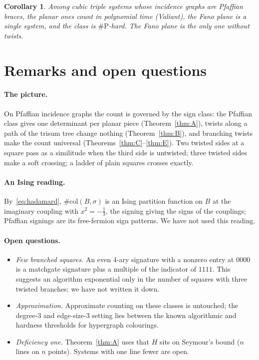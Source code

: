\documentclass[11pt]{article}
\newtheorem{corollary}[theorem]{Corollary}
\theoremstyle{definition}
\theoremstyle{remark}
\newcommand{\sharpP}{\#\mathrm{P}}
\newcommand{\col}{\#\mathrm{col}}
\begin{document}
\begin{corollary}\label{cor:picture}
Among cubic triple systems whose incidence graphs are Pfaffian braces, the
planar ones count in polynomial time (Valiant), the Fano plane is a single
system, and the class is $\sharpP$-hard. The Fano plane is the only one
without twists.
\end{corollary}

\section{Remarks and open questions}\label{sec:remarks}

\paragraph{The picture.} On Pfaffian incidence graphs the count is governed by
the sign class: the Pfaffian class gives one determinant per planar piece
(Theorem~\ref{thm:A}), twists along a path of the trisum tree change nothing
(Theorem~\ref{thm:B}), and branching twists make the count universal
(Theorems~\ref{thm:C}--\ref{thm:E}). Two twisted sides at a square pass as a
similitude when the third side is untwisted; three twisted sides make a soft
crossing; a ladder of plain squares crosses exactly.

\paragraph{An Ising reading.} By~\eqref{eq:hadamard}, $\col(B,\sigma)$ is an
Ising partition function on $B$ at the imaginary coupling with $x^2=-\tfrac13$,
the signing giving the signs of the couplings; Pfaffian signings are its
free-fermion sign patterns. We have not used this reading.

\paragraph{Open questions.}
\begin{itemize}
\item \emph{Few branched squares.} An even 4-ary signature with a nonzero
entry at $0000$ is a matchgate signature plus a multiple of the indicator of
$1111$. This suggests an algorithm exponential only in the number of squares
with three twisted branches; we have not written it down.
\item \emph{Approximation.} Approximate counting on these classes is untouched;
the degree-3 and edge-size-3 setting lies between the known algorithmic and
hardness thresholds for hypergraph colourings.
\item \emph{Deficiency one.} Theorem~\ref{thm:A} uses that $H$ sits on
Seymour's bound ($n$ lines on $n$ points). Systems with one line fewer are
open.
\end{itemize}
\end{document}
